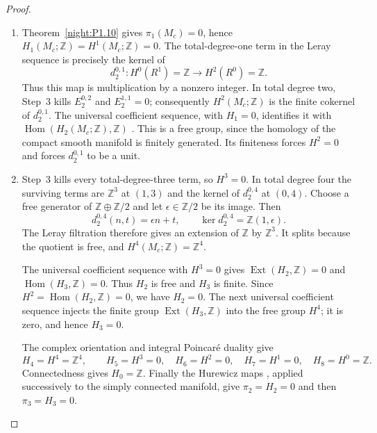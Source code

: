 \begin{proof}
\begin{enumerate}[label=\arabic*.]
\item Theorem~\ref{night:P1.10} gives $\pi_1(M_c)=0$, hence
$H_1(M_c;\mathbb Z)=H^1(M_c;\mathbb Z)=0$. The total-degree-one term
in the Leray sequence is precisely the kernel of
\[
 d_2^{0,1}:H^0(R^1)=\mathbb Z
                 \longrightarrow H^2(R^0)=\mathbb Z.
\]
Thus this map is multiplication by a nonzero integer. In total
degree two, Step~3 kills $E_2^{0,2}$ and $E_2^{1,1}=0$; consequently
$H^2(M_c;\mathbb Z)$ is the finite cokernel of $d_2^{0,1}$.
The universal coefficient sequence, with $H_1=0$, identifies it with
$\operatorname{Hom}(H_2(M_c;\mathbb Z),\mathbb Z)$
\cite[Theorem 3.2, p.~195, and Corollary 3.3, p.~196]{Hatcher2002}.
This is a free group, since the homology of the compact smooth
manifold is finitely generated. Its finiteness forces $H^2=0$ and
forces $d_2^{0,1}$ to be a unit.

\item Step~3 kills every total-degree-three term, so $H^3=0$.
In total degree four the surviving terms are $\mathbb Z^3$ at
$(1,3)$ and the kernel of $d_2^{0,4}$ at $(0,4)$. Choose a free
generator of $\mathbb Z\oplus\mathbb Z/2$ and let
$\epsilon\in\mathbb Z/2$ be its image. Then
\[
 d_2^{0,4}(n,t)=\epsilon n+t,
 \qquad
 \ker d_2^{0,4}=\mathbb Z(1,\epsilon).
\]
The Leray filtration therefore gives an extension of $\mathbb Z$
by $\mathbb Z^3$. It splits because the quotient is free, and
$H^4(M_c;\mathbb Z)=\mathbb Z^4$.

The universal coefficient sequence with $H^3=0$ gives
$\operatorname{Ext}(H_2,\mathbb Z)=0$ and
$\operatorname{Hom}(H_3,\mathbb Z)=0$. Thus $H_2$ is free and $H_3$
is finite. Since $H^2=\operatorname{Hom}(H_2,\mathbb Z)=0$, we have
$H_2=0$. The next universal coefficient sequence injects the finite
group $\operatorname{Ext}(H_3,\mathbb Z)$ into the free group $H^4$;
it is zero, and hence $H_3=0$.

The complex orientation and integral Poincar\'e duality
\cite[Theorem 3.30, p.~241]{Hatcher2002} give
\[
 H_4=H^4=\mathbb Z^4,\qquad
 H_5=H^3=0,\quad H_6=H^2=0,\quad H_7=H^1=0,\quad H_8=H^0=\mathbb Z.
\]
Connectedness gives $H_0=\mathbb Z$. Finally the Hurewicz maps
\cite[Theorem 4.32, p.~366]{Hatcher2002}, applied successively to the
simply connected manifold, give $\pi_2=H_2=0$ and then
$\pi_3=H_3=0$.
\end{enumerate}
\end{proof}
